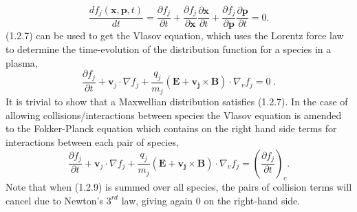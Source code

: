 \documentclass[12pt]{article}
\numberwithin{equation}{subsection}
\begin{document}
   \begin{equation}
      \frac{df_j(\bm{x},\bm{p},t)}{dt} = \frac{\partial f_j}{\partial t}
                                       + \frac{\partial f_j}{\partial \bm{x}}\frac{\partial \bm{x}}{\partial t}
                                       + \frac{\partial f_j}{\partial \bm{p}}\frac{\partial \bm{p}}{\partial t} = 0.                     
   \end{equation}
(1.2.7) can be used to get the Vlasov equation\cite{WessonD}, which uses the Lorentz force law to determine the time-evolution
of the distribution function for a species in a plasma,
   \begin{equation}
      \frac{\partial f_j}{\partial t} + \bm{v}_j\cdot\nabla f_j + \frac{q_j}{m_j}(\bm{E} + \bm{v_j}\times\bm{B})\cdot\nabla_v f_j = 0\;.
   \end{equation}
It is trivial to show that a Maxwellian distribution satisfies (1.2.7). In the case of allowing collisions/interactions between species the
Vlasov equation is amended to the Fokker-Planck equation which contains on the right hand side terms for interactions between each pair of species\cite{WessonD},
   \begin{equation}
      \frac{\partial f_j}{\partial t} + \bm{v}_j\cdot\nabla f_j
      + \frac{q_j}{m_j}(\bm{E} + \bm{v_j}\times\bm{B})\cdot\nabla_v f_j = \left(\frac{\partial f_j}{\partial t}\right)_c.
   \end{equation}
Note that when (1.2.9) is summed over all species, the pairs of collision terms will cancel due to Newton's $3^{rd}$ law,
giving again $0$ on the right-hand side.
\end{document}
